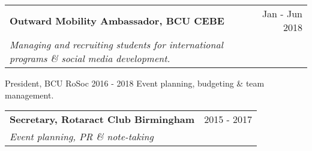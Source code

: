 \documentclass[onesided,12pt]{article}
\makeatletter
\newcommand{\resumeSubheading}[4]{
  \vspace{-1pt}\item
    \begin{tabular*}{0.97\textwidth}[t]{l@{\extracolsep{\fill}}r}
      \textbf{#1} & #2 \\
      \textit{\small#3} & \textit{\small #4} \\
    \end{tabular*}\vspace{-5pt}
}
\newcommand{\resumeSubHeadingListEnd}{\end{itemize}}
\makeatother
\begin{document}
        \resumeSubheading
        {Outward Mobility Ambassador, BCU CEBE}
        {Jan - Jun 2018}
        {Managing and recruiting students for international programs \& social media development.}
        
        \resumeSubheading
        {President, BCU RoSoc}
        {2016 - 2018}
        {Event planning, budgeting \& team management.}
         
        \resumeSubheading
        {Secretary, Rotaract Club Birmingham}
        {2015 - 2017}
        {Event planning, PR \& note-taking}

\resumeSubHeadingListEnd

\end{document}
